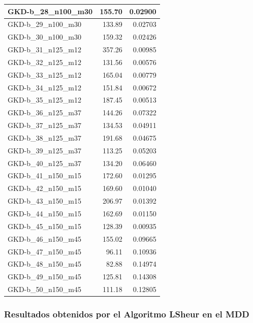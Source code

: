 \documentclass{article}
\begin{document}
\begin{table}[ht]
\begin{tabular}{|l|r|r|}
GKD-b\_28\_n100\_m30 & 155.70 & 0.02900 \\ \hline
GKD-b\_29\_n100\_m30 & 133.89 & 0.02703 \\ \hline
GKD-b\_30\_n100\_m30 & 159.32 & 0.02426 \\ \hline
GKD-b\_31\_n125\_m12 & 357.26 & 0.00985 \\ \hline
GKD-b\_32\_n125\_m12 & 131.56 & 0.00576 \\ \hline
GKD-b\_33\_n125\_m12 & 165.04 & 0.00779 \\ \hline
GKD-b\_34\_n125\_m12 & 151.84 & 0.00672 \\ \hline
GKD-b\_35\_n125\_m12 & 187.45 & 0.00513 \\ \hline
GKD-b\_36\_n125\_m37 & 144.26 & 0.07322 \\ \hline
GKD-b\_37\_n125\_m37 & 134.53 & 0.04911 \\ \hline
GKD-b\_38\_n125\_m37 & 191.68 & 0.04675 \\ \hline
GKD-b\_39\_n125\_m37 & 113.25 & 0.05203 \\ \hline
GKD-b\_40\_n125\_m37 & 134.20 & 0.06460 \\ \hline
GKD-b\_41\_n150\_m15 & 172.60 & 0.01295 \\ \hline
GKD-b\_42\_n150\_m15 & 169.60 & 0.01040 \\ \hline
GKD-b\_43\_n150\_m15 & 206.97 & 0.01392 \\ \hline
GKD-b\_44\_n150\_m15 & 162.69 & 0.01150 \\ \hline
GKD-b\_45\_n150\_m15 & 128.39 & 0.00935 \\ \hline
GKD-b\_46\_n150\_m45 & 155.02 & 0.09665 \\ \hline
GKD-b\_47\_n150\_m45 & 96.11 & 0.10936 \\ \hline
GKD-b\_48\_n150\_m45 & 82.88 & 0.14974 \\ \hline
GKD-b\_49\_n150\_m45 & 125.81 & 0.14308 \\ \hline
GKD-b\_50\_n150\_m45 & 111.18 & 0.12805 \\ \hline
\end{tabular}
\end{table}

\newpage
\subsubsection{Resultados obtenidos por el Algoritmo LSheur en el MDD}
\end{document}
